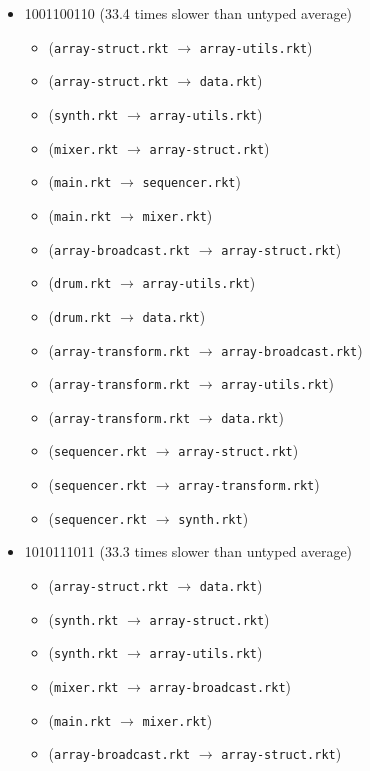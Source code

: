 \documentclass{article}
\newcommand{\mono}[1]{\texttt{#1}}
\begin{document}
\begin{itemize}
\begin{itemize}
  \end{itemize}
\item 1001100110 (33.4 times slower than untyped average)
  \begin{itemize}
  \item (\mono{array-struct.rkt} $\rightarrow$ \mono{array-utils.rkt})
  \item (\mono{array-struct.rkt} $\rightarrow$ \mono{data.rkt})
  \item (\mono{synth.rkt} $\rightarrow$ \mono{array-utils.rkt})
  \item (\mono{mixer.rkt} $\rightarrow$ \mono{array-struct.rkt})
  \item (\mono{main.rkt} $\rightarrow$ \mono{sequencer.rkt})
  \item (\mono{main.rkt} $\rightarrow$ \mono{mixer.rkt})
  \item (\mono{array-broadcast.rkt} $\rightarrow$ \mono{array-struct.rkt})
  \item (\mono{drum.rkt} $\rightarrow$ \mono{array-utils.rkt})
  \item (\mono{drum.rkt} $\rightarrow$ \mono{data.rkt})
  \item (\mono{array-transform.rkt} $\rightarrow$ \mono{array-broadcast.rkt})
  \item (\mono{array-transform.rkt} $\rightarrow$ \mono{array-utils.rkt})
  \item (\mono{array-transform.rkt} $\rightarrow$ \mono{data.rkt})
  \item (\mono{sequencer.rkt} $\rightarrow$ \mono{array-struct.rkt})
  \item (\mono{sequencer.rkt} $\rightarrow$ \mono{array-transform.rkt})
  \item (\mono{sequencer.rkt} $\rightarrow$ \mono{synth.rkt})
  \end{itemize}
\item 1010111011 (33.3 times slower than untyped average)
  \begin{itemize}
  \item (\mono{array-struct.rkt} $\rightarrow$ \mono{data.rkt})
  \item (\mono{synth.rkt} $\rightarrow$ \mono{array-struct.rkt})
  \item (\mono{synth.rkt} $\rightarrow$ \mono{array-utils.rkt})
  \item (\mono{mixer.rkt} $\rightarrow$ \mono{array-broadcast.rkt})
  \item (\mono{main.rkt} $\rightarrow$ \mono{mixer.rkt})
  \item (\mono{array-broadcast.rkt} $\rightarrow$ \mono{array-struct.rkt})

\end{itemize}
\end{itemize}
\end{document}
